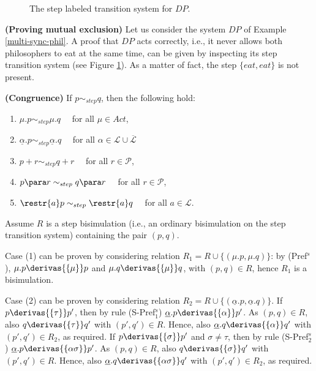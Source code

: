 \begin{figure}
\centering

\caption{The step labeled transition system for $DP$. 
}
\label{stepdining}
\end{figure}

\begin{example} {\bf (Proving mutual exclusion)} Let us consider the system $DP$ of Example \ref{multi-sync-phil}. 
A proof that $DP$ acts correctly, i.e., it never allows both philosophers to eat at the same time, can be given by
inspecting its step transition system (see Figure \ref{stepdining}). As a matter of fact, the step $\{eat, eat\}$ is not present.
\fine
\end{example}

\begin{theorem}\label{cong-step}{\bf (Congruence)}
If $p \sim_{step} q$, then the following hold:
\begin{enumerate}
\item  $\mu.p \sim_{step} \mu.q \quad$ for all $\mu \in Act$,
\item $\underline{\alpha}.p \sim_{step} \underline{\alpha}.q \quad$ for all $\alpha \in \mathcal{L}\cup\overline{\mathcal{L}}$
\item $p + r \sim_{step} q + r \quad $ for all  $r \in \mathcal{P}$,
\item $p \para r \sim_{step} q \para r \quad  $ for all  $r \in \mathcal{P}$,
\item $\restr{a}p \sim_{step} \restr{a}q \quad$ for all $a \in \mathcal{L}$.
\end{enumerate}

\proof
Assume $R$ is a step bisimulation (i.e., an ordinary bisimulation on the step transition system)
containing the pair $(p, q)$.

Case (1) can be proven by considering relation $R_1 = R \cup \{(\mu.p, \mu.q)\}$: by (Pref$^s$), 
$\mu.p \derivas{\{\mu\}} p$ and $\mu.q \derivas{\{\mu\}} q$, with $(p, q) \in R$, hence $R_1$ is a bisimulation.

Case (2) can be proven by considering relation $R_2 = R \cup \{(\underline\alpha.p, \underline\alpha.q)\}$. 
If $p \derivas{\{\tau\}} p'$, then by rule (S-Pref$_1^s$) $\underline\alpha.p \derivas{\{\alpha\}} p'$.
As $(p, q) \in R$, also $q \derivas{\{\tau\}} q'$ with $(p', q') \in R$. Hence, also $\underline\alpha.q \derivas{\{\alpha\}} q'$
with $(p', q') \in R_2$, as required. If $p \derivas{\{\sigma\}} p'$ and $\sigma \neq \tau$, then by rule (S-Pref$_2^s$) 
$\underline\alpha.p \derivas{\{\alpha\sigma\}} p'$. As $(p, q) \in R$, also $q \derivas{\{\sigma\}} q'$ with $(p', q') \in R$.
Hence, also $\underline\alpha.q \derivas{\{\alpha\sigma\}} q'$ with $(p', q') \in R_2$, as required. 


\end{theorem}
